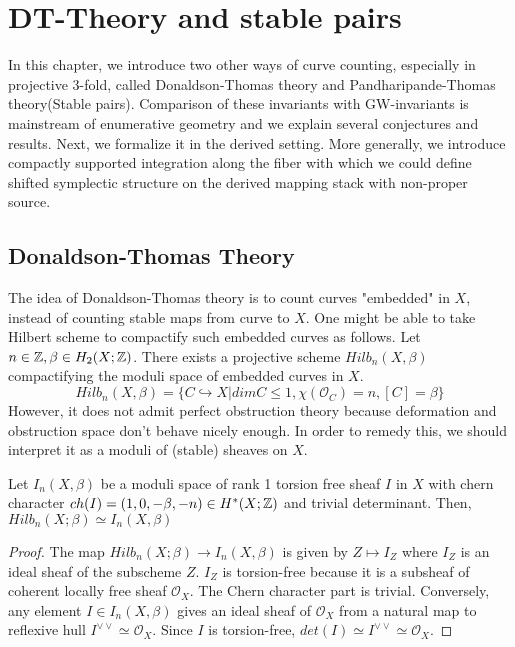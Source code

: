 \chapter{DT-Theory and stable pairs}
In this chapter, we introduce two other ways of curve counting, especially in projective 3-fold, called Donaldson-Thomas theory and Pandharipande-Thomas theory(Stable pairs). Comparison of these invariants with GW-invariants is mainstream of enumerative geometry and we explain several conjectures and results. Next, we formalize it in the derived setting. More generally, we introduce compactly supported integration along the fiber with which we could define shifted symplectic structure on the derived mapping stack with non-proper source.

\section{Donaldson-Thomas Theory}
The idea of Donaldson-Thomas theory is to count curves "embedded" in $X$, instead of counting stable maps from curve to $X$. One might be able to take Hilbert scheme to compactify such embedded curves as follows. Let $n \in \mathbb Z, \beta \in H_2(X;\mathbb Z)$. There exists a projective scheme $Hilb_n(X,\beta)$ compactifying the moduli space of embedded curves in $X$. 
\begin{equation*}
    Hilb_n(X, \beta) = \{C \hookrightarrow X | dimC \leq 1, \chi(\mathcal{O}_C)=n, [C]=\beta \}
\end{equation*}
However, it does not admit perfect obstruction theory because deformation and obstruction space don't behave nicely enough. In order to remedy this, we should interpret it as a moduli of (stable) sheaves on $X$. 
\begin{lem}
     Let $I_n(X, \beta)$ be a moduli space of rank 1 torsion free sheaf $I$ in $X$ with chern character $ch(I)=(1,0,-\beta, -n) \in H^*(X;\mathbb Z)$ and trivial determinant. Then, $Hilb_n(X;\beta) \simeq I_n(X, \beta)$
\end{lem}
\begin{proof}
    The map $Hilb_n(X;\beta) \to I_n(X,\beta)$ is given by $Z \mapsto I_Z$ where $I_Z$ is an ideal sheaf of the subscheme $Z$. $I_Z$ is torsion-free because it is a subsheaf of coherent locally free sheaf $\mathcal{O}_X$. The Chern character part is trivial. Conversely, any element $I \in I_n(X,\beta)$ gives an ideal sheaf of $\mathcal{O}_X$ from a natural map to reflexive hull $I^{\vee\vee} \simeq \mathcal{O}_X$. Since $I$ is torsion-free, $det(I) \simeq I^{\vee\vee} \simeq \mathcal{O}_X$.
\end{proof}
